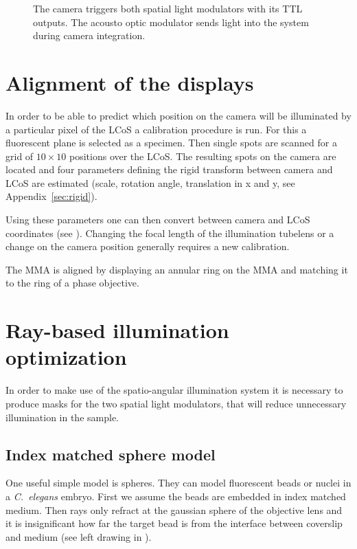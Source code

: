 \begin{figure}[!hbt]
  \centering
  
  \caption{The camera triggers both spatial light modulators with its
    TTL outputs. The acousto optic modulator sends light into the
    system during camera integration.}
  \label{fig:memi-electronics}
\end{figure}

\section{Alignment of the displays}

In order to be able to predict which position on the camera will be
illuminated by a particular pixel of the LCoS a calibration procedure
is run. For this a fluorescent plane is selected as a specimen. Then
single spots are scanned for a grid of $10\times10$ positions over the
LCoS. The resulting spots on the camera are located and four
parameters defining the rigid transform between camera and LCoS are
estimated (scale, rotation angle, translation in x and y, see
Appendix~\ref{sec:rigid}).

Using these parameters one can then convert between camera and LCoS
coordinates (see ). Changing the focal
length of the illumination tubelens or a change on the camera position
generally requires a new calibration.


The MMA is aligned by displaying an annular ring on the MMA and
matching it to the ring of a phase objective.


\section{Ray-based illumination optimization}
In order to make use of the spatio-angular illumination system it is
necessary to produce masks for the two spatial light modulators, that
will reduce unnecessary illumination in the sample.

\subsection{Index matched sphere model}
\label{sec:shadow-map}
One useful simple model is spheres. They can model fluorescent beads
or nuclei in a \emph{C.~elegans} embryo. First we assume the beads are
embedded in index matched medium. Then rays only refract at the
gaussian sphere of the objective lens and it is insignificant how far
the target bead is from the interface between coverslip and medium
(see left drawing in ).


